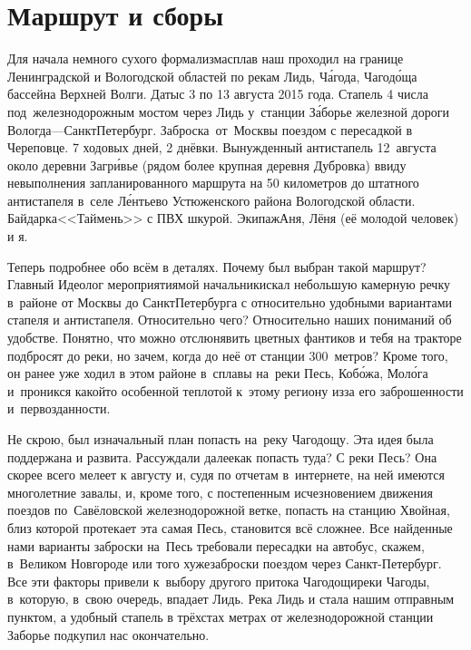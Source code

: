 \chapter{Маршрут и сборы}

Для начала немного сухого формализма\mdash сплав наш проходил на границе Ленинградской и Вологодской областей по рекам Лидь, Ч\'{а}года, Чагод\'{о}ща бассейна Верхней Волги. Даты\mdash с 3 по 13 августа 2015 года. Стапель 4 числа под~железнодорожным мостом через Лидь у~станции З\'{а}борье железной дороги Вологда\thinspace---\thinspace Санкт\sdash Петербург. Заброска~от~Москвы поездом с пересадкой в Череповце. 7 ходовых дней, 2 днёвки. Вынужденный антистапель 12~августа около деревни Загр\'{и}вье (рядом более крупная деревня Дубровка) ввиду невыполнения запланированного маршрута на 50 километров до штатного антистапеля в~селе Л\'{е}нтьево Устюженского района Вологодской области.  Байдарка\mdash <<Таймень>> с ПВХ шкурой. Экипаж\mdash Аня, Лёня (её молодой человек) и я.

Теперь подробнее обо всём в деталях. Почему был выбран такой маршрут? Главный Идеолог мероприятия\mdash мой начальник\mdash искал небольшую камерную речку в~районе от Москвы до Санкт\sdash Петербурга с относительно удобными вариантами стапеля и антистапеля. Относительно чего? Относительно наших пониманий об удобстве. Понятно, что можно отслюнявить цветных фантиков и тебя на тракторе подбросят до реки, но зачем, когда до неё от станции 300~метров? Кроме того, он ранее уже ходил в этом районе в~сплавы на~реки Песь, Коб\'{о}жа, Мол\'{о}га и~проникся какой\sdash то особенной теплотой к~этому региону из\sdash за его заброшенности и~первозданности.

Не скрою, был изначальный план попасть на~реку Чагодощу. Эта идея была поддержана и развита. Рассуждали далее\mdash как попасть туда? С реки Песь? Она скорее всего мелеет к августу и, судя по отчетам в~интернете, на ней имеются многолетние завалы, и, кроме того, с постепенным исчезновением движения поездов по~Савёловской железнодорожной ветке, попасть на станцию Хвойная, близ которой протекает эта самая Песь, становится всё сложнее. Все найденные нами варианты заброски на~Песь требовали пересадки на автобус, скажем, в~Великом Новгороде или того хуже\mdash заброски поездом через Санкт-Петербург. Все эти факторы привели к~выбору другого притока Чагодощи\mdash реки Чагоды, в~которую, в~свою очередь, впадает Лидь. Река Лидь и стала нашим отправным пунктом, а удобный стапель в трёхстах метрах от железнодорожной станции Заборье подкупил нас окончательно. 

